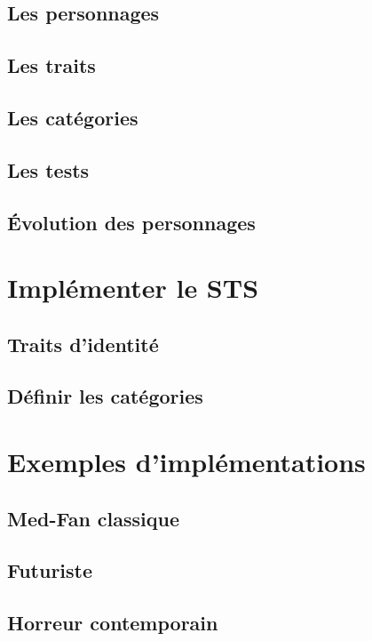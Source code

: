 \documentclass[a4paper,10pt,twoside,twocolumn]{article}
\begin{document}
 \subsection{Les personnages}
 \label{princip::char}
 
 \subsection{Les traits}
 \label{princip::traits}
 
 \subsection{Les catégories}
 \label{princip::cat}
 
 \subsection{Les tests}
 \label{princip::test}
 
 \subsection{Évolution des personnages}
 \label{princip::evolv}
 
 \section{Implémenter le STS}
 
 \subsection{Traits d'identité}
 \label{implem::traits}
 
 \subsection{Définir les catégories}
 \label{implem::cat}
 
 \section{Exemples d'implémentations}
 
 \subsection{Med-Fan classique}
 
 \subsection{Futuriste}
 
 \subsection{Horreur contemporain}
 
\end{document}
